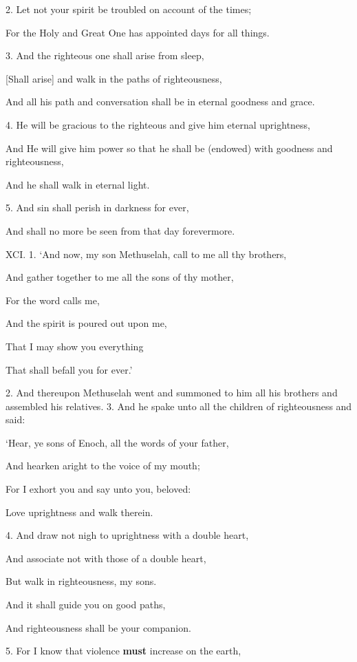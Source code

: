2. Let not your spirit be troubled on account of the times;

For the Holy and Great One has appointed days for all things.

3. And the righteous one shall arise from sleep,

[Shall arise] and walk in the paths of righteousness,

And all his path and conversation shall be in eternal goodness and grace.

4. He will be gracious to the righteous and give him eternal uprightness,

And He will give him power so that he shall be (endowed) with goodness and righteousness,

And he shall walk in eternal light.

5. And sin shall perish in darkness for ever,

And shall no more be seen from that day forevermore.


XCI. 1. ‘And now, my son Methuselah, call to me all thy brothers,

And gather together to me all the sons of thy mother,

For the word calls me,

And the spirit is poured out upon me,

That I may show you everything

That shall befall you for ever.’

2. And thereupon Methuselah went and summoned
to him all his brothers and assembled his relatives.
3. And he spake unto all the children of righteousness
and said:

‘Hear, ye sons of Enoch, all the words of your father,

And hearken aright to the voice of my mouth;

For I exhort you and say unto you, beloved:

Love uprightness and walk therein.

4. And draw not nigh to uprightness with a double heart,

And associate not with those of a double heart,

But walk in righteousness, my sons.

And it shall guide you on good paths,

And righteousness shall be your companion.

5. For I know that violence \textbf{must} increase on the earth,

